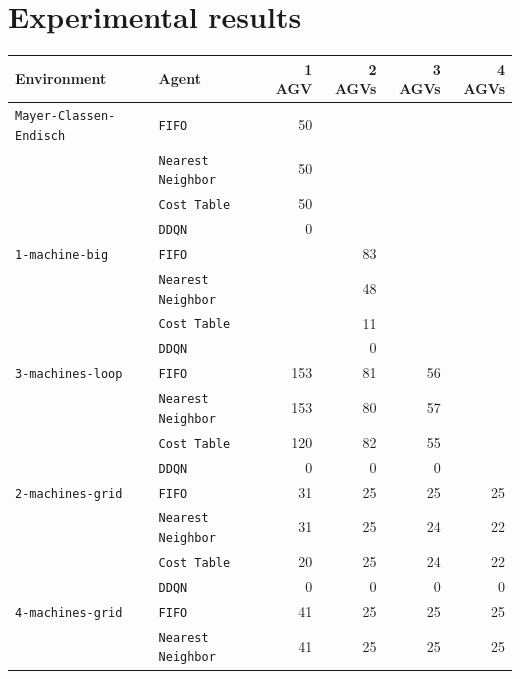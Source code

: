 \documentclass[sn-mathphys]{sn-jnl}
\begin{document}
\section{Experimental results}
\label{sec:results}


\begin{table}[ht]
\centering
\bgroup
\def\arraystretch{1.1} %
    
\begin{tabular}{|l|l||r|r|r|r|}
\hline
Environment & Agent & 1 AGV & 2 AGVs & 3 AGVs & 4 AGVs \\
\hline \texttt{Mayer-Classen-Endisch} & \texttt{FIFO}& 50  \quad & & &  \\ 
 & \texttt{Nearest Neighbor} & 50  \quad & & &  \\ 
 & \texttt{Cost Table} & 50  \quad & & &  \\ 
 & \texttt{DDQN} & 0  \quad & & &  \\ 
\hline \texttt{1-machine-big} & \texttt{FIFO}& & 83  \quad & &  \\ 
 & \texttt{Nearest Neighbor} & & 48  \quad & &  \\ 
 & \texttt{Cost Table} & & 11  \quad & &  \\ 
 & \texttt{DDQN} & & 0  \quad & &  \\ 
\hline \texttt{3-machines-loop} & \texttt{FIFO}& 153  \quad & 81  \quad & 56  \quad &  \\ 
 & \texttt{Nearest Neighbor} & 153  \quad & 80  \quad & 57  \quad &  \\ 
 & \texttt{Cost Table} & 120  \quad & 82  \quad & 55  \quad &  \\ 
 & \texttt{DDQN} & 0  \quad & 0  \quad & 0  \quad &  \\ 
\hline \texttt{2-machines-grid} & \texttt{FIFO}& 31  \quad & 25  \quad & 25  \quad & 25  \quad  \\ 
 & \texttt{Nearest Neighbor} & 31  \quad & 25  \quad & 24  \quad & 22  \quad  \\ 
 & \texttt{Cost Table} & 20  \quad & 25  \quad & 24  \quad & 22  \quad  \\ 
 & \texttt{DDQN} & 0  \quad & 0  \quad & 0  \quad & 0  \quad  \\ 
\hline \texttt{4-machines-grid} & \texttt{FIFO}& 41  \quad & 25  \quad & 25  \quad & 25  \quad  \\ 
 & \texttt{Nearest Neighbor} & 41  \quad & 25  \quad & 25  \quad & 25  \quad  \\ 

\end{tabular}
\end{table}
\end{document}
